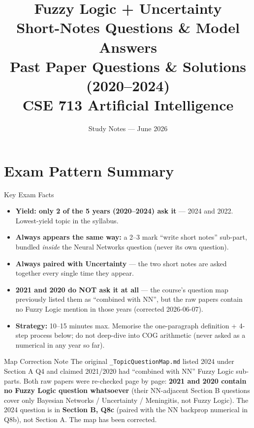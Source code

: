 \documentclass[12pt,a4paper]{article}
\title{\color{planblue}\Huge\bfseries Fuzzy Logic + Uncertainty\\[0.4em]
  \Large Short-Notes Questions \& Model Answers\\[0.2em]
  \normalsize Past Paper Questions \& Solutions (2020--2024)\\[0.2em]
  \normalsize CSE 713 Artificial Intelligence}
\author{Study Notes --- June 2026}
\date{}
\begin{document}
\maketitle
\tableofcontents
\newpage

\section*{Exam Pattern Summary}

\begin{keybox}{Key Exam Facts}
\begin{itemize}[noitemsep]
  \item \textbf{Yield: only 2 of the 5 years (2020--2024) ask it} --- 2024 and 2022. Lowest-yield topic in the syllabus.
  \item \textbf{Always appears the same way:} a 2--3 mark ``write short notes'' sub-part, bundled \emph{inside} the Neural Networks question (never its own question).
  \item \textbf{Always paired with Uncertainty} --- the two short notes are asked together every single time they appear.
  \item \textbf{2021 and 2020 do NOT ask it at all} --- the course's question map previously listed them as ``combined with NN'', but the raw papers contain no Fuzzy Logic mention in those years (corrected 2026-06-07).
  \item \textbf{Strategy:} 10--15 minutes max. Memorise the one-paragraph definition + 4-step process below; do not deep-dive into COG arithmetic (never asked as a numerical in any year so far).
\end{itemize}
\end{keybox}

\begin{warnbox}{Map Correction Note}
The original \texttt{\_TopicQuestionMap.md} listed 2024 under Section A Q4 and claimed 2021/2020 had ``combined with NN'' Fuzzy Logic sub-parts. Both raw papers were re-checked page by page: \textbf{2021 and 2020 contain no Fuzzy Logic question whatsoever} (their NN-adjacent Section B questions cover only Bayesian Networks / Uncertainty / Meningitis, not Fuzzy Logic). The 2024 question is in \textbf{Section B, Q8c} (paired with the NN backprop numerical in Q8b), not Section A. The map has been corrected.
\end{warnbox}
\end{document}
